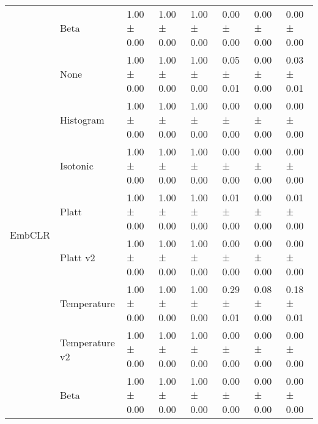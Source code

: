 \begin{tabular}{llllllll}
 & Beta & 1.00 ± 0.00 & 1.00 ± 0.00 & 1.00 ± 0.00 & 0.00 ± 0.00 & 0.00 ± 0.00 & 0.00 ± 0.00 \\
\cline{1-8}
\multirow[t]{8}{*}{EmbCLR} & None & 1.00 ± 0.00 & 1.00 ± 0.00 & 1.00 ± 0.00 & 0.05 ± 0.01 & 0.00 ± 0.00 & 0.03 ± 0.01 \\
 & Histogram & 1.00 ± 0.00 & 1.00 ± 0.00 & 1.00 ± 0.00 & 0.00 ± 0.00 & 0.00 ± 0.00 & 0.00 ± 0.00 \\
 & Isotonic & 1.00 ± 0.00 & 1.00 ± 0.00 & 1.00 ± 0.00 & 0.00 ± 0.00 & 0.00 ± 0.00 & 0.00 ± 0.00 \\
 & Platt & 1.00 ± 0.00 & 1.00 ± 0.00 & 1.00 ± 0.00 & 0.01 ± 0.00 & 0.00 ± 0.00 & 0.01 ± 0.00 \\
 & Platt v2 & 1.00 ± 0.00 & 1.00 ± 0.00 & 1.00 ± 0.00 & 0.00 ± 0.00 & 0.00 ± 0.00 & 0.00 ± 0.00 \\
 & Temperature & 1.00 ± 0.00 & 1.00 ± 0.00 & 1.00 ± 0.00 & 0.29 ± 0.01 & 0.08 ± 0.00 & 0.18 ± 0.01 \\
 & Temperature v2 & 1.00 ± 0.00 & 1.00 ± 0.00 & 1.00 ± 0.00 & 0.00 ± 0.00 & 0.00 ± 0.00 & 0.00 ± 0.00 \\
 & Beta & 1.00 ± 0.00 & 1.00 ± 0.00 & 1.00 ± 0.00 & 0.00 ± 0.00 & 0.00 ± 0.00 & 0.00 ± 0.00 \\
\cline{1-8}
\bottomrule
\end{tabular}
